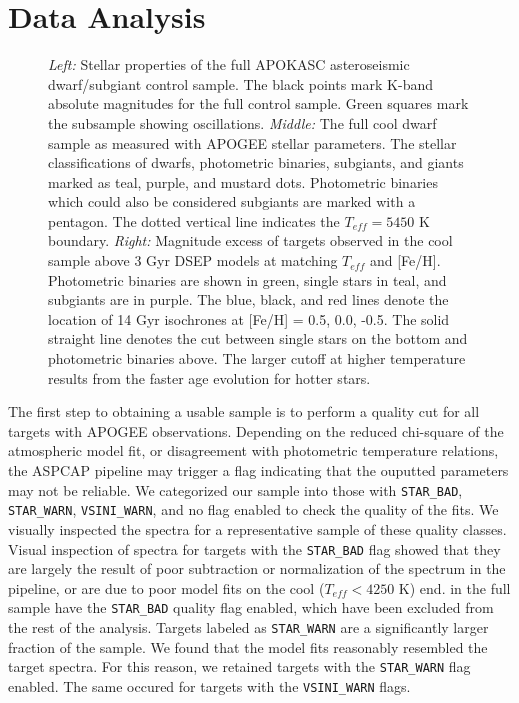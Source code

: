 \documentclass[manuscript]{aastex6}
\newcommand{\Teff}{\ensuremath{T_{eff}}}
\newcommand{\STARBAD}{\texttt{STAR\_BAD}}
\newcommand{\STARWARN}{\texttt{STAR\_WARN}}
\newcommand{\VSINIWARN}{\texttt{VSINI\_WARN}}
\newcommand{\gvs}{\authorcomment1}
\begin{document}
\section{Data Analysis}
\label{sec:analysis}

\begin{figure*}
    \caption{\emph{Left:} Stellar properties of the full APOKASC 
    asteroseismic dwarf/subgiant control sample. The black points mark
    K-band absolute magnitudes for the full control sample. Green squares mark
    the subsample showing oscillations. 
    \emph{Middle:} The full cool dwarf sample as measured with APOGEE stellar 
    parameters. The stellar classifications of dwarfs, photometric binaries, 
    subgiants, and giants marked as teal, purple, and mustard
    dots. Photometric binaries which could also be considered subgiants are
    marked with a pentagon.  The dotted vertical line indicates the 
    \(\Teff = 5450\) K boundary.
    \emph{Right:} Magnitude excess of targets observed in the cool 
    sample above 3 Gyr DSEP models at matching \Teff{} and 
    [Fe/H]. Photometric binaries are shown in green, single stars in teal, and
    subgiants are in purple. The blue, black, and red lines denote the location of 14 Gyr
    isochrones at [Fe/H] = 0.5, 0.0, -0.5. The solid straight line denotes the 
    cut between single stars on the bottom and photometric binaries
above. The larger cutoff at higher temperature results from the faster age
evolution for hotter stars.\label{fig:sample}}
\end{figure*}

The first step to obtaining a usable sample is to perform a 
quality cut for all targets with APOGEE observations.
Depending on the reduced chi-square of the atmospheric model fit, or
disagreement with photometric temperature relations, the ASPCAP pipeline
may trigger a flag indicating that the ouputted parameters may not be
reliable. We categorized our sample into those with \STARBAD, \STARWARN,
\VSINIWARN{}, and no flag enabled to check the quality of the fits. We
visually inspected the spectra for a representative sample of these
quality classes. 
Visual inspection of spectra for targets with the \STARBAD{} flag showed that they are 
largely the result of poor subtraction or normalization of the spectrum in the
pipeline, or are due to poor model fits on the cool (\(\Teff < 4250\) K) end. 
\gvs{Calculate percentage} in the full sample have the \STARBAD{} quality 
flag enabled, which have been excluded from the rest of the analysis. 
Targets labeled as \STARWARN{} are a significantly larger fraction of the 
sample. We found that the model fits reasonably resembled the target spectra. 
For this reason, we retained targets with the \STARWARN{} flag enabled. The 
same occured for targets with the \VSINIWARN{} flags.
\end{document}
